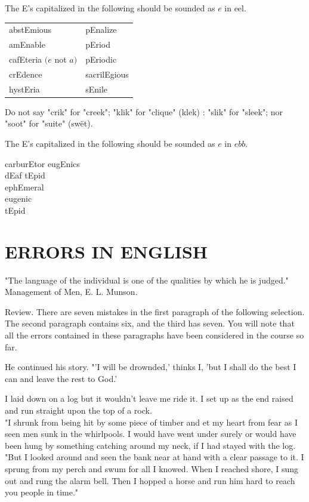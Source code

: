 \documentclass[10pt]{article}
\begin{document}
The E's capitalized in the following should be sounded as $e$ in eel.

\begin{center}
\begin{tabular}{ll}
abstEmious & pEnalize \\
amEnable & pEriod \\
cafEteria $(e$ not $a)$ & pEriodic \\
crEdence & sacrilEgious \\
hystEria & sEnile \\
\end{tabular}
\end{center}

Do not say "crik" for "creek"; "klik" for "clique" (klek) : "slik" for "sleek"; nor "soot" for "suite" (swët).

The E's capitalized in the following should be sounded as $e$ in $e b b$.

\begin{displayquote}
carburEtor eugEnics\\
dEaf tEpid\\
ephEmeral\\
eugenic\\
tEpid
\end{displayquote}

\section*{ERRORS IN ENGLISH}
"The language of the individual is one of the qualities by which he is judged." Management of Men, E. L. Munson.

Review. There are seven mistakes in the first paragraph of the following selection. The second paragraph contains six, and the third has seven. You will note that all the errors contained in these paragraphs have been considered in the course so far.

He continued his story. "'I will be drownded,' thinks I, 'but I shall do the best I can and leave the rest to God.'

I laid down on a log but it wouldn't leave me ride it. I set up as the end raised and run straight upon the top of a rock.\\
"I shrunk from being hit by some piece of timber and et my heart from fear as I seen men sunk in the whirlpools. I would have went under surely or would have been hung by something catching around my neck, if I had stayed with the log.\\
"But I looked around and seen the bank near at hand with a clear passage to it. I sprung from my perch and swum for all I knowed. When I reached shore, I sung out and rung the alarm bell. Then I hopped a horse and run him hard to reach you people in time."
\end{document}
